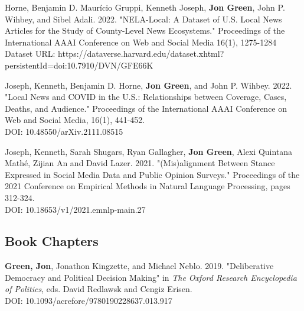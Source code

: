 \documentclass[letterpaper]{article}
\begin{document}
\begin{etaremune}
\item Horne, Benjamin D. Maur\'{i}cio Gruppi, Kenneth Joseph, \textbf{Jon Green}, John P. Wihbey, and Sibel Adali. 2022. "NELA-Local: A Dataset of U.S. Local News Articles for the Study of County-Level News Ecosystems." Proceedings of the International AAAI Conference on Web and Social Media 16(1), 1275-1284\\
Dataset URL: https://dataverse.harvard.edu/dataset.xhtml?persistentId=doi:10.7910/DVN/GFE66K

\item Joseph, Kenneth, Benjamin D. Horne, \textbf{Jon Green}, and John P. Wihbey. 2022. "Local News and COVID in the U.S.: Relationships between Coverage, Cases, Deaths, and Audience." Proceedings of the International AAAI Conference on Web and Social Media, 16(1), 441-452.\\
DOI: 10.48550/arXiv.2111.08515

\item Joseph, Kenneth, Sarah Shugars, Ryan Gallagher, \textbf{Jon Green}, Alexi Quintana Mathé, Zijian An and David Lazer. 2021. "(Mis)alignment Between Stance Expressed in Social Media Data and Public Opinion Surveys." Proceedings of the 2021 Conference on Empirical Methods in Natural Language Processing, pages 312-324. \\
DOI: 10.18653/v1/2021.emnlp-main.27
\end{etaremune}

\subsection*{Book Chapters}

\begin{etaremune}
\item \textbf{Green, Jon}, Jonathon Kingzette, and Michael Neblo. 2019. "Deliberative Democracy and Political Decision Making" in \textit{The Oxford Research Encyclopedia of Politics}, eds. David Redlawsk and Cengiz Erisen.\\
DOI: 10.1093/acrefore/9780190228637.013.917
\end{etaremune}


\end{document}
